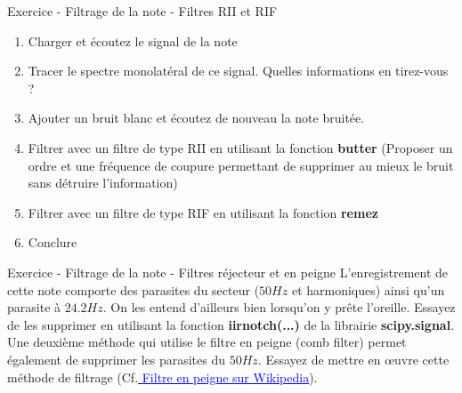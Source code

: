 \documentclass{beamer}
\newcounter{exampleBlockCounter}
\begin{document}
\begin{frame}
\begin{exampleblock}{Exercice  - Filtrage de la note - Filtres RII et RIF}
\begin{enumerate}
  \item Charger et écoutez le signal de la note
  \item Tracer le spectre monolatéral de ce signal. Quelles informations en tirez-vous ?
  \item Ajouter un bruit blanc et écoutez de nouveau la note bruitée.
  \item Filtrer avec un filtre de type RII en utilisant la fonction \textbf{butter} (Proposer un ordre et une fréquence de coupure permettant de supprimer au mieux le bruit sans détruire l'information)
  \item Filtrer avec un filtre de type RIF en utilisant la fonction \textbf{remez}
  \item Conclure
\end{enumerate}
\end{exampleblock}
\end{frame}

\begin{frame}
\begin{exampleblock}{Exercice  - Filtrage de la note - Filtres réjecteur et en peigne}
\justifying L'enregistrement de cette note comporte des parasites du secteur ($50Hz$ et harmoniques) ainsi qu'un parasite à $24.2Hz$. On les entend d'ailleurs bien lorsqu'on y prête l'oreille. Essayez de les supprimer en utilisant la fonction \textbf{iirnotch(...)} de la librairie \textbf{scipy.signal}. Une deuxième méthode qui utilise le filtre en peigne (comb filter) permet également de supprimer les parasites du $50Hz$. Essayez de mettre en œuvre cette méthode de filtrage (Cf.\href{https://fr.wikipedia.org/wiki/Filtre_en_peigne}{ \textcolor{blue}{\underline{Filtre en peigne sur Wikipedia}}}).
\end{exampleblock}
\end{frame}
\end{document}
